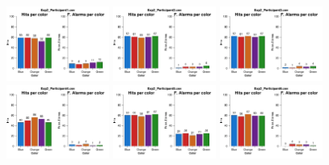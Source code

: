\begin{figure}[th]
\centering
\includegraphics[width=0.30\textwidth]{Figures/Color_Exp2_P1} \includegraphics[width=0.30\textwidth]{Figures/Color_Exp2_P2} \includegraphics[width=0.30\textwidth]{Figures/Color_Exp2_P3}
\includegraphics[width=0.30\textwidth]{Figures/Color_Exp2_P4} \includegraphics[width=0.30\textwidth]{Figures/Color_Exp2_P5} \includegraphics[width=0.30\textwidth]{Figures/Color_Exp2_P6}

\end{figure}
